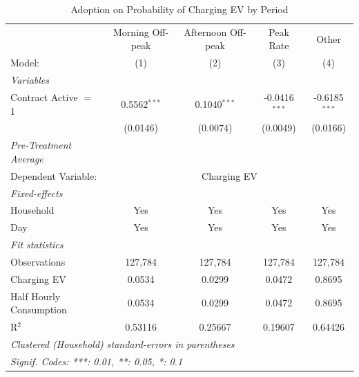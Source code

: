 
\begin{table}[htbp]
   \caption{\label{tab:ev-charging} Adoption on Probability of Charging EV by Period}
   \centering
   \begin{tabular}{lcccc}
      \tabularnewline \midrule \midrule
                                     & Morning Off-peak & Afternoon Off-peak & Peak Rate       & Other \\   
      Model:                         & (1)              & (2)                & (3)             & (4)\\  
      \midrule
      \emph{Variables}\\
      Contract Active $=$ 1          & 0.5562$^{***}$   & 0.1040$^{***}$     & -0.0416$^{***}$ & -0.6185$^{***}$\\   
                                     & (0.0146)         & (0.0074)           & (0.0049)        & (0.0166)\\   
\midrule
\emph{Pre-Treatment Average}\\
      Dependent Variable: & \multicolumn{4}{c}{Charging EV}\\
      \midrule
      \emph{Fixed-effects}\\
      Household                      & Yes              & Yes                & Yes             & Yes\\  
      Day                            & Yes              & Yes                & Yes             & Yes\\  
      \midrule
      \emph{Fit statistics}\\
      Observations                   & 127,784          & 127,784            & 127,784         & 127,784\\  
      Charging EV        & 0.0534           & 0.0299             & 0.0472          & 0.8695\\  
      Half Hourly Consumption        & 0.0534           & 0.0299             & 0.0472          & 0.8695\\  
      R$^2$                          & 0.53116          & 0.25667            & 0.19607         & 0.64426\\  
      \midrule \midrule
      \multicolumn{5}{l}{\emph{Clustered (Household) standard-errors in parentheses}}\\
      \multicolumn{5}{l}{\emph{Signif. Codes: ***: 0.01, **: 0.05, *: 0.1}}\\
   \end{tabular}
\end{table}


